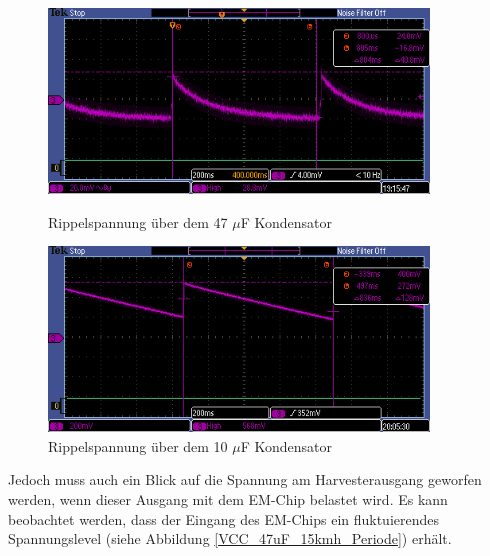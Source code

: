 \begin{figure}[ht]
 \begin{minipage}[t]{0.5\textwidth}
    \includegraphics[width=0.90\textwidth]{3Vorgehen/imag/47uF_mit_Limiter_AC.PNG}
    \caption{Rippelspannung über dem 47 $\mu$F Kondensator}
	\label{47uF_mit_Limiter_AC} 
 \end{minipage}
 \begin{minipage}[t]{0.5\textwidth}
    \includegraphics[width=0.90\textwidth]{3Vorgehen/imag/10uF_mit_Limiter_DC.PNG}
    \caption{Rippelspannung über dem 10 $\mu$F Kondensator}
	\label{10uF_mit_Limiter_DC} 
 \end{minipage}
\end{figure}

Jedoch muss auch ein Blick auf die Spannung am Harvesterausgang geworfen werden, wenn dieser Ausgang mit dem EM-Chip belastet wird. Es kann beobachtet werden, dass der Eingang des EM-Chips ein fluktuierendes Spannungslevel (siehe Abbildung \ref{VCC_47uF_15kmh_Periode}) erhält. 

